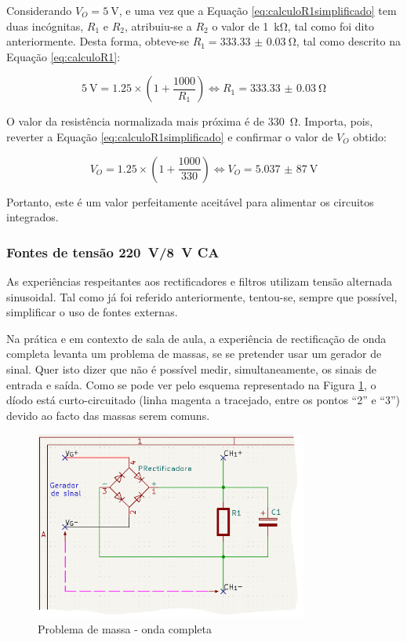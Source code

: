 Considerando $V_{O} = \SI{5}{\volt}$, e uma vez que a Equação \ref{eq:calculoR1simplificado} tem duas incógnitas, $R_{1}$ e $R_{2}$, atribuiu-se a $R_{2}$ o valor de \SI{1}{\kilo\ohm}, tal como foi dito anteriormente. Desta forma, obteve-se $R_{1} = \SI{333.33(3)}{\ohm}$, tal como descrito na Equação \ref{eq:calculoR1}: 

\begin{equation} \label{eq:calculoR1}
	\SI{5}{\volt} = 1.25 \times (1 + \frac{1000}{R_{1}}) \Leftrightarrow R_{1} = \SI{333.33(3)}{\ohm}
\end{equation}

O valor da resistência normalizada mais próxima é de \SI{330}{\ohm}. Importa, pois, reverter a Equação \ref{eq:calculoR1simplificado} e confirmar o valor de  $V_{O}$ obtido:

\begin{equation} \label{eq:confirmacaoVout}
	V_{O} = 1.25 \times (1 + \frac{1000}{330}) \Leftrightarrow V_{O} = \SI{5,037(87)}{\volt}
\end{equation}

Portanto, este é um valor perfeitamente aceitável para alimentar os circuitos integrados.

\subsubsection{Fontes de tensão \SI{220}{\volt}/\SI{8}{\volt} CA}
\label{sec:fontealternada}
As experiências respeitantes aos rectificadores e filtros utilizam tensão alternada sinusoidal. Tal como já foi referido anteriormente, tentou-se, sempre que possível, simplificar o uso de fontes externas. 

Na prática e em contexto de sala de aula, a experiência de rectificação de onda completa levanta um problema de massas, se se pretender usar um gerador de sinal. Quer isto dizer que não é possível medir, simultaneamente, os sinais de entrada e saída. Como se pode ver pelo esquema representado na Figura \ref{fig:gerador-massa}, o díodo está curto-circuitado (linha magenta a tracejado, entre os pontos ``2'' e ``3'') devido ao facto das massas serem comuns. 

\begin{figure}[hbtp]
	\centering
	\includegraphics[width=0.8\textwidth]{figures/sch_completa_CC.png}
	\caption{Problema de massa - onda completa}
	\label{fig:gerador-massa}
\end{figure}


